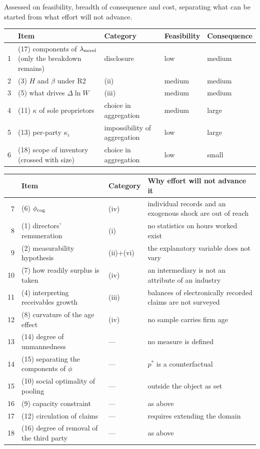 Assessed on feasibility, breadth of consequence and cost, separating what can be started from
what effort will not advance.

\begin{center}
\begin{tabularx}{\textwidth}{@{}rXlll@{}}
\toprule
 & Item & Category & Feasibility & Consequence \\
\midrule
1 & (17) components of $\lambda_{\rm novel}$ (only the breakdown remains) & disclosure & low & medium \\
2 & (3) $H$ and $\beta$ under R2 & (ii) & medium & medium \\
3 & (5) what drives $\Delta\ln W$ & (iii) & medium & medium \\
4 & (11) $\kappa$ of sole proprietors & choice in aggregation & medium & large \\
5 & (13) per-party $\kappa_i$ & impossibility of aggregation & low & large \\
6 & (18) scope of inventory (crossed with size) & choice in aggregation & low & small \\
\bottomrule
\end{tabularx}
\label{tab:unresolved-priority}
\end{center}

\begin{center}
\begin{tabularx}{\textwidth}{@{}rXll@{}}
\toprule
 & Item & Category & Why effort will not advance it \\
\midrule
7 & (6) $\phi_{\rm cog}$ & (iv) & individual records and an exogenous shock are out of reach \\
8 & (1) directors' remuneration & (i) & no statistics on hours worked exist \\
9 & (2) measurability hypothesis & (ii)+(vi) & the explanatory variable does not vary \\
10 & (7) how readily surplus is taken & (iv) & an intermediary is not an attribute of an industry \\
11 & (4) interpreting receivables growth & (iii) & balances of electronically recorded claims are not surveyed \\
12 & (8) curvature of the age effect & (iv) & no sample carries firm age \\
13 & (14) degree of unmannedness & --- & no measure is defined \\
14 & (15) separating the components of $\phi$ & --- & $p^{\ast}$ is a counterfactual \\
15 & (10) social optimality of pooling & --- & outside the object as set \\
16 & (9) capacity constraint & --- & as above \\
17 & (12) circulation of claims & --- & requires extending the domain \\
18 & (16) degree of removal of the third party & --- & as above \\
\bottomrule
\end{tabularx}
\label{tab:unresolved-blocked}
\end{center}

